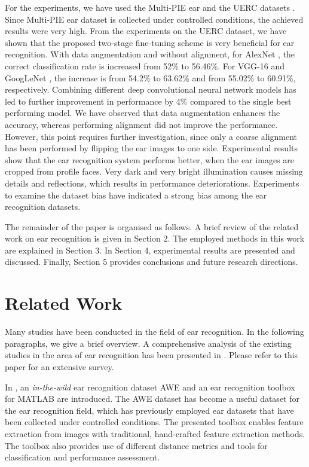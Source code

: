 \documentclass[11pt,journal,compsoc]{IEEEtran}
\begin{document}
For the experiments, we have used the Multi-PIE ear and the UERC datasets \cite{Emersic_2017_b}. Since Multi-PIE ear dataset is collected under controlled conditions, the achieved results were very high. From the experiments on the UERC dataset, we have shown that the proposed two-stage fine-tuning scheme is very beneficial for ear recognition. With data augmentation and without alignment, for AlexNet \cite{Krizhevsky_2012}, the correct classification rate is increased from 52\% to 56.46\%. For VGG-16 \cite{Simonyan_2014} and GoogLeNet \cite{Szegedy_2015}, the increase is from 54.2\% to 63.62\% and from 55.02\% to 60.91\%, respectively. Combining different deep convolutional neural network models has led to further improvement in performance by 4\% compared to the single best performing model. We have observed that data augmentation enhances the accuracy, whereas performing alignment did not improve the performance. However, this point requires further investigation, since only a coarse alignment has been performed by flipping the ear images to one side. Experimental results show that the ear recognition system performs better, when the ear images are cropped from profile faces. Very dark and very bright illumination causes missing details and reflections, which results in performance deteriorations. Experiments to examine the dataset bias have indicated a strong bias among the ear recognition datasets. 

The remainder of the paper is organised as follows. A brief review of the related work on ear recognition is given in Section 2. The employed methods in this work are explained in Section 3. In Section 4, experimental results are presented and discussed. Finally, Section 5 provides conclusions and future research directions.

\section{Related Work}
Many studies have been conducted in the field of ear recognition. In the following paragraphs, we give a brief overview. A comprehensive analysis of the existing studies in the area of ear recognition has been presented in \cite{Emersic_2017_a}. Please refer to this paper for an extensive survey.

In \cite{Emersic_2017_a}, an \textit{in-the-wild} ear recognition dataset AWE and an ear recognition toolbox for MATLAB are introduced. The AWE dataset has become a useful dataset for the ear recognition field, which has previously employed ear datasets that have been collected under controlled conditions. The presented toolbox enables feature extraction from images with traditional, hand-crafted feature extraction methods. The toolbox also provides use of different distance metrics and tools for classification and performance assessment. 
\end{document}
